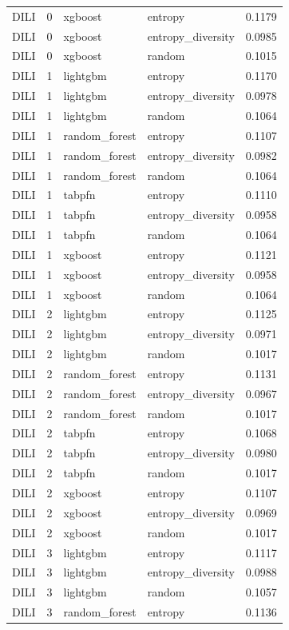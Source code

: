 \begin{tabular}{lrllr}
DILI & 0 & xgboost & entropy & 0.1179 \\
DILI & 0 & xgboost & entropy_diversity & 0.0985 \\
DILI & 0 & xgboost & random & 0.1015 \\
DILI & 1 & lightgbm & entropy & 0.1170 \\
DILI & 1 & lightgbm & entropy_diversity & 0.0978 \\
DILI & 1 & lightgbm & random & 0.1064 \\
DILI & 1 & random_forest & entropy & 0.1107 \\
DILI & 1 & random_forest & entropy_diversity & 0.0982 \\
DILI & 1 & random_forest & random & 0.1064 \\
DILI & 1 & tabpfn & entropy & 0.1110 \\
DILI & 1 & tabpfn & entropy_diversity & 0.0958 \\
DILI & 1 & tabpfn & random & 0.1064 \\
DILI & 1 & xgboost & entropy & 0.1121 \\
DILI & 1 & xgboost & entropy_diversity & 0.0958 \\
DILI & 1 & xgboost & random & 0.1064 \\
DILI & 2 & lightgbm & entropy & 0.1125 \\
DILI & 2 & lightgbm & entropy_diversity & 0.0971 \\
DILI & 2 & lightgbm & random & 0.1017 \\
DILI & 2 & random_forest & entropy & 0.1131 \\
DILI & 2 & random_forest & entropy_diversity & 0.0967 \\
DILI & 2 & random_forest & random & 0.1017 \\
DILI & 2 & tabpfn & entropy & 0.1068 \\
DILI & 2 & tabpfn & entropy_diversity & 0.0980 \\
DILI & 2 & tabpfn & random & 0.1017 \\
DILI & 2 & xgboost & entropy & 0.1107 \\
DILI & 2 & xgboost & entropy_diversity & 0.0969 \\
DILI & 2 & xgboost & random & 0.1017 \\
DILI & 3 & lightgbm & entropy & 0.1117 \\
DILI & 3 & lightgbm & entropy_diversity & 0.0988 \\
DILI & 3 & lightgbm & random & 0.1057 \\
DILI & 3 & random_forest & entropy & 0.1136 \\

\end{tabular}
